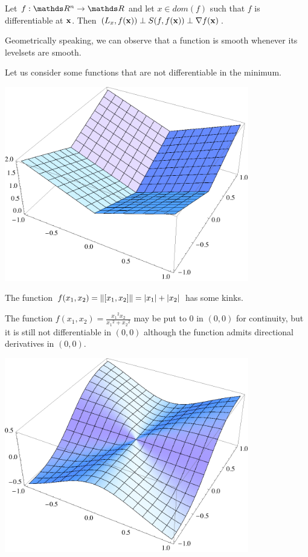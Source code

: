\documentclass[computationalMathematics.tex]{subfiles}
\begin{document}
\begin{proposition}
	Let $f: \R^n \to \R$ and let $x \in dom(f)$ such that $f$ is differentiable at ${\bf x }$. Then $(L_x, f({\bf x })) \perp S(f, f({\bf x })) \perp \nabla f({\bf x })$.
\end{proposition}

Geometrically speaking, we can observe that a function is smooth whenever its levelsets are smooth.

\begin{example}
	Let us consider some functions that are not differentiable in the minimum.
	\begin{center}
		\begin{minipage}{0.45\textwidth}
			\includegraphics[width=0.8\textwidth]{pics/27set/nondiff1.png}
		\end{minipage}
		\begin{minipage}{0.45\textwidth}
			The function $f(x_1,x_2) = \left\lVert[x_1,x_2]\right\rVert = |x_1| + |x_2|$ has some kinks.
		\end{minipage}
	
		\begin{minipage}{0.45\textwidth}
			The function $f(x_1,x_2) = \frac{{x_1}^2 x_2}{{x_1}^2 + {x_2}^2}$ may be put to $0$ in $(0, 0)$ for continuity, but it is still not differentiable in $(0, 0)$ although the function admits directional derivatives in $(0, 0)$.
		\end{minipage}
		\begin{minipage}{0.45\textwidth}
			\centering
			\includegraphics[width=0.8\textwidth]{pics/27set/nondiff2.png}
		\end{minipage}
	

\end{center}
\end{example}
\end{document}
